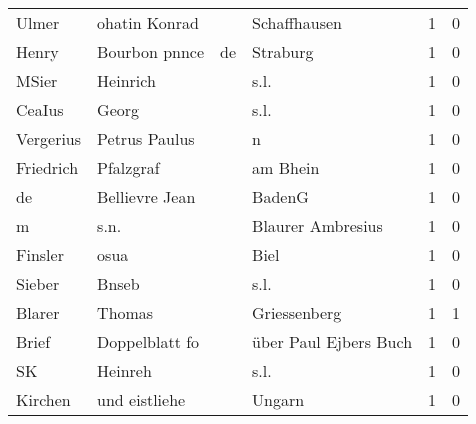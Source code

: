\begin{tabular}{llllrr}
                    Ulmer &                      ohatin Konrad &             &                                Schaffhausen &          1 &         0 \\
                    Henry &                      Bourbon pnnce &          de &                                    Straburg &          1 &         0 \\
                    MSier &                           Heinrich &             &                                        s.l. &          1 &         0 \\
                   CeaIus &                              Georg &             &                                        s.l. &          1 &         0 \\
                Vergerius &                      Petrus Paulus &             &                                           n &          1 &         0 \\
                Friedrich &                          Pfalzgraf &             &                                    am Bhein &          1 &         0 \\
                       de &                     Bellievre Jean &             &                                      BadenG &          1 &         0 \\
                        m &                               s.n. &             &                           Blaurer Ambresius &          1 &         0 \\
                  Finsler &                               osua &             &                                        Biel &          1 &         0 \\
                   Sieber &                              Bnseb &             &                                        s.l. &          1 &         0 \\
                   Blarer &                             Thomas &             &                                Griessenberg &          1 &         1 \\
                    Brief &                     Doppelblatt fo &             &                       über Paul Ejbers Buch &          1 &         0 \\
                       SK &                            Heinreh &             &                                        s.l. &          1 &         0 \\
                  Kirchen &                      und eistliehe &             &                                      Ungarn &          1 &         0 \\

\end{tabular}
